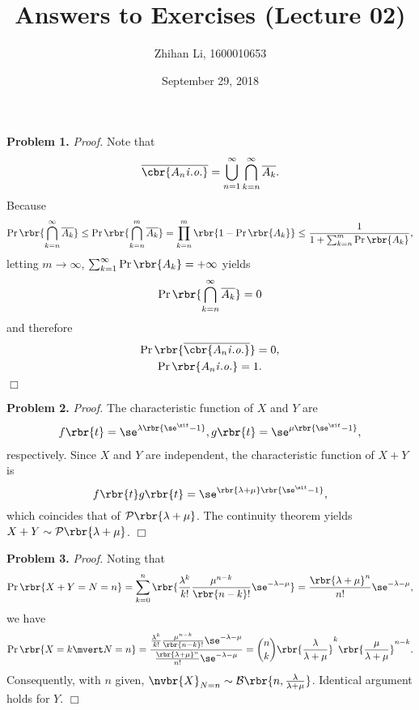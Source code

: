\documentclass[english, nochinese]{pnote}
\title{Answers to Exercises (Lecture 02)}
\author{Zhihan Li, 1600010653}
\date{September 29, 2018}
\DeclareMathOperator\oppr{\mathrm{Pr}}
\begin{document}
\maketitle

\textbf{Problem 1.} \textit{Proof.} Note that
\begin{equation} \label{Eq:IODef}
\overline{\cbr{ A_n \mathit{i.o.} }} = \bigcup_{ n = 1 }^{\infty} \bigcap_{ k = n }^{\infty} \overline{A_k}.
\end{equation}
Because
\begin{equation}
\oppr \rbr{ \bigcap_{ k = n }^{\infty} \overline{A_k} } \le \oppr \rbr{ \bigcap_{ k = n }^m \overline{A_k} } = \prod_{ k = n }^m \rbr{ 1 - \oppr \rbr{A_k} } \le \frac{1}{ 1 + \sum_{ k = n }^m \oppr \rbr{A_k} },
\end{equation}
letting $ m \rightarrow \infty $, $ \sum_{ k = 1 }^{\infty} \oppr \rbr{A_k} = +\infty $ yields
\begin{equation}
\oppr \rbr{ \bigcap_{ k = n }^{\infty} \overline{A_k} } = 0
\end{equation}
and therefore
\begin{gather}
\oppr \rbr{\overline{\cbr{ A_n \mathit{i.o.} }}} = 0, \\
\oppr \rbr{ A_n \mathit{i.o.} } = 1.
\end{gather}
\hfill$\Box$

\textbf{Problem 2.} \textit{Proof.} The characteristic function of $X$ and $Y$ are
\begin{gather}
f \rbr{t} =  \se^{ \lambda \rbr{ \se^{ \si t } - 1 } },
g \rbr{t} =  \se^{ \mu \rbr{ \se^{ \si t } - 1 } },
\end{gather}
respectively. Since $X$ and $Y$ are independent, the characteristic function of $ X + Y $ is
\begin{equation}
f \rbr{t} g \rbr{t} = \se^{ \rbr{ \lambda + \mu } \rbr{ \se^{ \si t } - 1 } },
\end{equation}
which coincides that of $ \mathcal{P} \rbr{ \lambda + \mu } $. The continuity theorem yields $ X + Y \sim \mathcal{P} \rbr{ \lambda + \mu } $.
\hfill$\Box$

\textbf{Problem 3.} \textit{Proof.} Noting that
\begin{equation}
\oppr \rbr{ X + Y = N = n } = \sum_{ k = 0 }^n \rbr{ \frac{\lambda^k}{ k ! } \frac{\mu^{ n - k }}{ \rbr{ n - k } ! } \se^{ -\lambda - \mu} } = \frac{\rbr{ \lambda + \mu }^n}{ n ! } \se^{ -\lambda - \mu},
\end{equation}
we have
\begin{equation}
\oppr \rbr{ X = k \mvert N = n } = \frac{ \frac{\lambda^k}{ k ! } \frac{\mu^{ n - k }}{ \rbr{ n - k } ! } \se^{ -\lambda - \mu} }{ \frac{\rbr{ \lambda + \mu }^n}{ n ! } \se^{ -\lambda - \mu} } = \binom{n}{k} \rbr{\frac{\lambda}{ \lambda + \mu }}^k \rbr{\frac{\mu}{ \lambda + \mu }}^{ n - k }.
\end{equation}
Consequently, with $n$ given, $ \nvbr{X}_{ N = n } \sim \mathcal{B} \rbr{ n, \frac{\lambda}{ \lambda + \mu } } $. Identical argument holds for $Y$.
\hfill$\Box$
\end{document}
